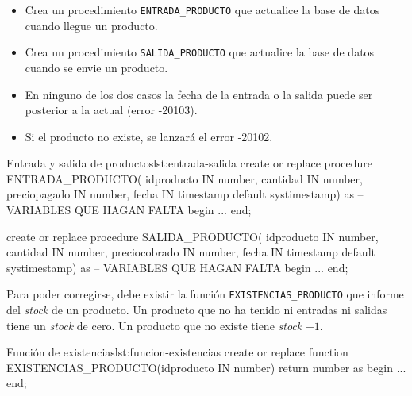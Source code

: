 \begin{homeworkProblem}

  \begin{itemize}
  \item Crea un procedimiento \texttt{ENTRADA\_PRODUCTO} que actualice la base de datos cuando llegue un producto.
  \item Crea un procedimiento \texttt{SALIDA\_PRODUCTO} que actualice la base de datos cuando se envie un producto.
  \item En ninguno de los dos casos la fecha de la entrada o la salida puede ser posterior a la actual (error -20103).
  \item Si el producto no existe, se lanzará el error -20102.
  \end{itemize}


  
  \begin{listadosql}{Entrada y salida de productos}{lst:entrada-salida}
create or replace procedure ENTRADA_PRODUCTO(
  idproducto IN number,
  cantidad IN number,
  preciopagado IN number,
  fecha IN timestamp default systimestamp)
as
  -- VARIABLES QUE HAGAN FALTA
begin
  ...
end; 

create or replace procedure SALIDA_PRODUCTO(
  idproducto IN number,
  cantidad IN number,
  preciocobrado IN number,
  fecha IN timestamp default systimestamp)
as
  -- VARIABLES QUE HAGAN FALTA
begin
  ...
end; 
  \end{listadosql}


  
  Para poder corregirse, debe existir la función \texttt{EXISTENCIAS\_PRODUCTO} que informe del \textit{stock} de un producto. Un producto que no ha tenido ni entradas ni salidas tiene un \textit{stock} de cero. Un producto que no existe tiene \textit{stock} $-1$.

  \begin{listadosql}{Función de existencias}{lst:funcion-existencias}
create or replace function EXISTENCIAS_PRODUCTO(idproducto IN number) return number
as
begin
  ...
end; 
  \end{listadosql}  
  


\end{homeworkProblem}

